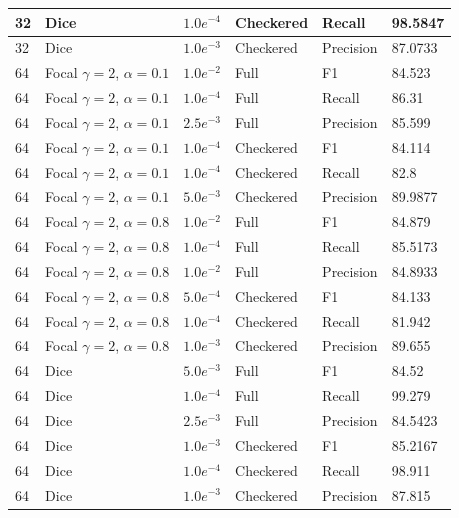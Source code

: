 \begin{table}[H]
\begin{center}
\begin{tabular}{|l|l|l|l|l|l|}
\hline
32  & Dice                                & $1.0e^{-4}$& Checkered & Recall        & 98.5847  \\
\hline
32  & Dice                                & $1.0e^{-3}$& Checkered & Precision     & 87.0733  \\
\hline
64  & Focal $\gamma = 2$, $\alpha = 0.1$  & $1.0e^{-2}$& Full      & F1        & 84.523   \\
\hline
64  & Focal $\gamma = 2$, $\alpha = 0.1$  & $1.0e^{-4}$& Full      & Recall    & 86.31    \\
\hline
64  & Focal $\gamma = 2$, $\alpha = 0.1$  & $2.5e^{-3}$& Full      & Precision & 85.599   \\
\hline
64  & Focal $\gamma = 2$, $\alpha = 0.1$  & $1.0e^{-4}$& Checkered & F1        & 84.114   \\
\hline
64  & Focal $\gamma = 2$, $\alpha = 0.1$  & $1.0e^{-4}$& Checkered & Recall    & 82.8     \\
\hline
64  & Focal $\gamma = 2$, $\alpha = 0.1$  & $5.0e^{-3}$& Checkered & Precision & 89.9877  \\
\hline
64  & Focal $\gamma = 2$, $\alpha = 0.8$  & $1.0e^{-2}$& Full      & F1        & 84.879   \\
\hline
64  & Focal $\gamma = 2$, $\alpha = 0.8$  & $1.0e^{-4}$& Full      & Recall    & 85.5173  \\
\hline
64  & Focal $\gamma = 2$, $\alpha = 0.8$  & $1.0e^{-2}$& Full      & Precision & 84.8933  \\
\hline
64  & Focal $\gamma = 2$, $\alpha = 0.8$  & $5.0e^{-4}$& Checkered & F1        & 84.133   \\
\hline
64  & Focal $\gamma = 2$, $\alpha = 0.8$  & $1.0e^{-4}$& Checkered & Recall    & 81.942   \\
\hline
64  & Focal $\gamma = 2$, $\alpha = 0.8$  & $1.0e^{-3}$& Checkered & Precision & 89.655   \\
\hline
64  & Dice                                & $5.0e^{-3}$& Full      & F1            & 84.52    \\
\hline
64  & Dice                                & $1.0e^{-4}$& Full      & Recall        & 99.279   \\
\hline
64  & Dice                                & $2.5e^{-3}$& Full      & Precision     & 84.5423  \\
\hline
64  & Dice                                & $1.0e^{-3}$& Checkered & F1            & 85.2167  \\
\hline
64  & Dice                                & $1.0e^{-4}$& Checkered & Recall        & 98.911   \\
\hline
64  & Dice                                & $1.0e^{-3}$& Checkered & Precision     & 87.815   \\
\hline


\end{tabular}
\end{center}
\end{table}

